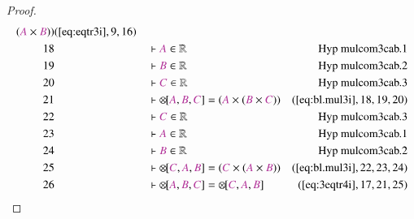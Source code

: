 \begin{proof}
\begin{align}
      ( \mc{A} \times \mc{B} )
      )&(\mbox{\ref{eq:eqtr3i}},9,16)\notag
  \\ 18 &&  & \vdash \mc{A} \in
\mathbb{R}&\text{Hyp~mulcom3cab.1}\notag%
  \\ 19 &&  & \vdash \mc{B} \in
\mathbb{R}&\text{Hyp~mulcom3cab.2}\notag%
  \\ 20 &&  & \vdash \mc{C} \in
\mathbb{R}&\text{Hyp~mulcom3cab.3}\notag%
  \\ 21 &&  & \vdash {\otimes\hspace{-1pt}[} \mc{A} , \mc{B} , \mc{C} ] = (
      \mc{A} \times ( \mc{B} \times \mc{C} )
      )&(\mbox{\ref{eq:bl.mul3i}},18,19,20)\notag
  \\ 22 &&  & \vdash \mc{C} \in
\mathbb{R}&\text{Hyp~mulcom3cab.3}\notag%
  \\ 23 &&  & \vdash \mc{A} \in
\mathbb{R}&\text{Hyp~mulcom3cab.1}\notag%
  \\ 24 &&  & \vdash \mc{B} \in
\mathbb{R}&\text{Hyp~mulcom3cab.2}\notag%
  \\ 25 &&  & \vdash {\otimes\hspace{-1pt}[} \mc{C} , \mc{A} , \mc{B} ] = (
      \mc{C} \times ( \mc{A} \times \mc{B} )
      )&(\mbox{\ref{eq:bl.mul3i}},22,23,24)\notag
  \\ 26 &&  & \vdash {\otimes\hspace{-1pt}[} \mc{A} , \mc{B} , \mc{C} ] =
      {\otimes\hspace{-1pt}[} \mc{C} , \mc{A} , \mc{B}
      ]&(\mbox{\ref{eq:3eqtr4i}},17,21,25)\notag
\end{align}
\end{proof}

